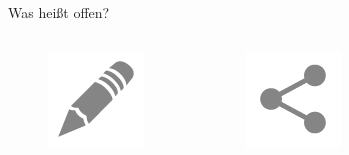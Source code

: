 \begin{frame}{Was heißt offen?}
\begin{block}{}
\begin{columns}
\begin{figure}
    \includegraphics[scale=0.3]{section_open_data_open_editable.png}
   \end{figure}
   \begin{figure}\centering
    \includegraphics[scale=0.3]{section_open_data_open_shareable.png}
   \end{figure}
  \end{columns}
 \end{block}
\end{frame}

